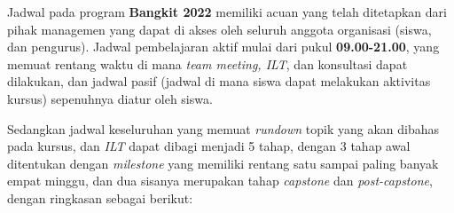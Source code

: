 Jadwal pada program \textbf{Bangkit 2022} memiliki acuan yang telah ditetapkan dari pihak managemen yang dapat di akses oleh seluruh anggota organisasi (siswa, dan pengurus). Jadwal pembelajaran aktif mulai dari pukul \textbf{09.00-21.00}, yang memuat rentang waktu di mana \textit{team meeting, ILT}, dan konsultasi dapat dilakukan, dan jadwal pasif (jadwal di mana siswa dapat melakukan aktivitas kursus) sepenuhnya diatur oleh siswa.

Sedangkan jadwal keseluruhan yang memuat \textit{rundown} topik yang akan dibahas pada kursus, dan \textit{ILT} dapat dibagi menjadi 5 tahap, dengan 3 tahap awal ditentukan dengan \textit{milestone} yang memiliki rentang satu sampai paling banyak empat minggu, dan dua sisanya merupakan tahap \textit{capstone} dan \textit{post-capstone}, dengan ringkasan sebagai berikut:

